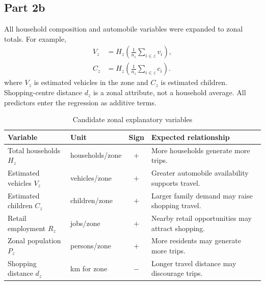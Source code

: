 \documentclass[11pt]{article}
\begin{document}
\subsection{Part 2b}
All household composition and automobile variables were expanded to zonal totals. For example,
\begin{align*}
V_z&=H_z\left(\frac{1}{n_z}\sum_{i\in z}v_i\right),\\
C_z&=H_z\left(\frac{1}{n_z}\sum_{i\in z}c_i\right).
\end{align*}
where $V_z$ is estimated vehicles in the zone and $C_z$ is estimated children. Shopping-centre distance $d_z$ is a zonal attribute, not a household average. All predictors enter the regression as additive terms.
\begin{table}[H]\centering\small
\caption{Candidate zonal explanatory variables}\begin{tabular}{llcl}\toprule
Variable & Unit & Sign & Expected relationship \\\midrule
Total households $H_z$ & households/zone & $+$ & More households generate more trips.\\
Estimated vehicles $V_z$ & vehicles/zone & $+$ & Greater automobile availability supports travel.\\
Estimated children $C_z$ & children/zone & $+$ & Larger family demand may raise shopping travel.\\
Retail employment $R_z$ & jobs/zone & $+$ & Nearby retail opportunities may attract shopping.\\
Zonal population $P_z$ & persons/zone & $+$ & More residents may generate more trips.\\
Shopping distance $d_z$ & km for zone & $-$ & Longer travel distance may discourage trips.\\
\bottomrule\end{tabular}\end{table}
\end{document}
